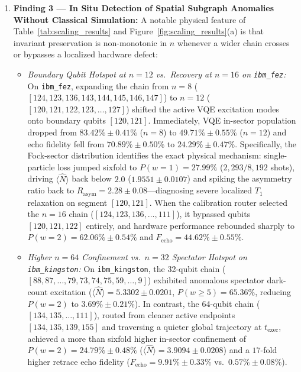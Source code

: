 \documentclass[aps,pra,reprint,superscriptaddress,floatfix,nofootinbib]{revtex4-2}
\begin{document}
\begin{enumerate}
    \item \textbf{Finding 3 --- In Situ Detection of Spatial Subgraph Anomalies Without Classical Simulation:}
    A notable physical feature of Table~\ref{tab:scaling_results} and Figure~\ref{fig:scaling_results}(a) is that invariant preservation is non-monotonic in $n$ whenever a wider chain crosses or bypasses a localized hardware defect:
    \begin{itemize}
        \item \emph{Boundary Qubit Hotspot at $n = 12$ vs.\ Recovery at $n = 16$ on \texttt{ibm\_fez}:} On \texttt{ibm\_fez}, expanding the chain from $n = 8$ ($[124, 123, 136, 143, 144, 145, 146, 147]$) to $n = 12$ ($[120, 121, 122, 123, \dots, 127]$) shifted the active VQE excitation modes onto boundary qubits $[120, 121]$. Immediately, VQE in-sector population dropped from $83.42\% \pm 0.41\%$ ($n = 8$) to $49.71\% \pm 0.55\%$ ($n = 12$) and echo fidelity fell from $70.89\% \pm 0.50\%$ to $24.29\% \pm 0.47\%$. Specifically, the Fock-sector distribution identifies the exact physical mechanism: single-particle loss jumped sixfold to $P(w=1) = 27.99\%$ ($2,293 / 8,192$ shots), driving $\langle \hat{N} \rangle$ back below $2.0$ ($1.9551 \pm 0.0107$) and spiking the asymmetry ratio back to $R_{\text{asym}} = 2.28 \pm 0.08$---diagnosing severe localized $T_1$ relaxation on segment $[120, 121]$. When the calibration router selected the $n = 16$ chain ($[124, 123, 136, \dots, 111]$), it bypassed qubits $[120, 121, 122]$ entirely, and hardware performance rebounded sharply to $P(w=2) = 62.06\% \pm 0.54\%$ and $F_{\text{echo}} = 44.62\% \pm 0.55\%$.
        \item \emph{Higher $n = 64$ Confinement vs.\ $n = 32$ Spectator Hotspot on \texttt{ibm\_kingston}:} On \texttt{ibm\_kingston}, the 32-qubit chain ($[88, 87, \dots, 79, 73, 74, 75, 59, \dots, 9]$) exhibited anomalous spectator dark-count excitation ($\langle \hat{N} \rangle = 5.3302 \pm 0.0201$, $P(w \ge 5) = 65.36\%$, reducing $P(w=2)$ to $3.69\% \pm 0.21\%$). In contrast, the 64-qubit chain ($[134, 135, \dots, 111]$), routed from cleaner active endpoints $[134, 135, 139, 155]$ and traversing a quieter global trajectory at $t_{\text{exec}}$, achieved a more than sixfold higher in-sector confinement of $P(w=2) = 24.79\% \pm 0.48\%$ ($\langle \hat{N} \rangle = 3.9094 \pm 0.0208$) and a $17$-fold higher retrace echo fidelity ($F_{\text{echo}} = 9.91\% \pm 0.33\%$ vs.\ $0.57\% \pm 0.08\%$).
    \end{itemize}

\end{enumerate}
\end{document}
